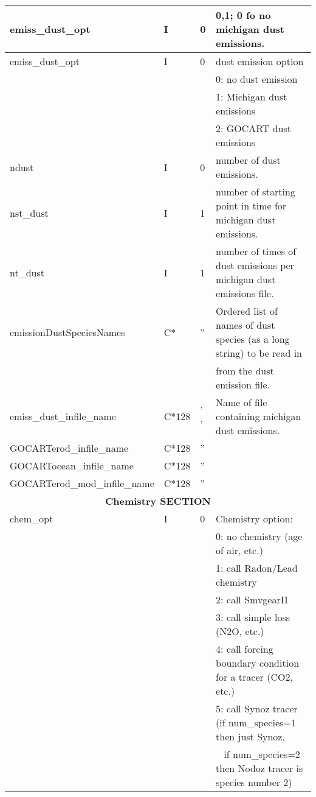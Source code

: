 {\begin{landscape}
\begin{center}
\begin{longtable}{|l|l|l|l|}
emiss\_dust\_opt         & I & 0 & 0,1; 0 fo no michigan dust emissions.  \\ \hline
emiss\_dust\_opt         & I & 0 & dust emission option \\
                         &   &   & 0: no dust emission    \\
                         &   &   & 1: Michigan dust emissions  \\
                         &   &   & 2: GOCART dust emissions \\ \hline
ndust                  & I & 0 & number of dust emissions.  \\ \hline
nst\_dust               & I & 1 & number of starting point in time for michigan  dust emissions.  \\ \hline
nt\_dust                & I & 1 & number of times of dust emissions per michigan dust emissions file.  \\ \hline
emissionDustSpeciesNames & C* & '' & Ordered list of names of dust species (as a long string) to be read in \\
                              &      &    & from the dust emission file.  \\
emiss\_dust\_infile\_name & C*128 & ' ' & Name of file containing michigan dust emissions. \\ \hline
GOCARTerod\_infile\_name  & C*128 & ''  &  \\ \hline
GOCARTocean\_infile\_name  & C*128 & ''  &  \\ \hline
GOCARTerod\_mod\_infile\_name  & C*128 & ''  &  \\ \hline\hline
%
%
%
\multicolumn{4}{|c|}{\bf Chemistry SECTION} \\ \hline\hline
chem\_opt        & I & 0 & Chemistry option:  \\
                 &   &   & 0:  no chemistry (age of air, etc.)  \\
                 &   &   & 1:  call Radon/Lead chemistry  \\
                 &   &   & 2:  call SmvgearII  \\
                 &   &   & 3:  call simple loss (N2O, etc.)  \\
                 &   &   & 4:  call forcing boundary condition for a tracer (CO2, etc.)  \\
                 &   &   & 5:  call Synoz tracer (if num\_species=1 then just Synoz,  \\
                 &   &   & \mbox{  }     if num\_species=2 then Nodoz tracer is species number 2)  \\

\end{longtable}
\end{center}
\end{landscape}}
